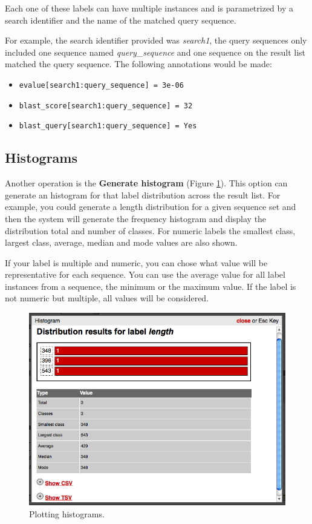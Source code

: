Each one of these labels can have multiple instances and is parametrized by a search identifier
and the name of the matched query sequence.

For example, the search identifier provided was \textit{search1}, the
query sequences only included one sequence named \textit{query\_sequence} and
one sequence on the result list matched the query sequence.
The following annotations would be made:

\begin{itemize}
  \item \texttt{evalue[search1:query\_sequence] = 3e-06}
  \item \texttt{blast\_score[search1:query\_sequence] = 32}
  \item \texttt{blast\_query[search1:query\_sequence] = Yes}
\end{itemize}

\subsection{Histograms}

Another operation is the \textbf{Generate histogram} (Figure \ref{fig:histogram_man}).
This option can generate an histogram
for that label distribution across the result list. For example, you could generate a length
distribution for a given sequence set and then the system will generate the frequency histogram
and display the distribution total and number of classes.
For numeric labels the smallest class, largest class, average, median and mode values are also shown.

If your label is multiple and numeric, you can chose what value will be representative for each sequence.
You can use the average value for all label instances from a sequence, the minimum or the maximum value.
If the label is not numeric but multiple, all values will be considered.

\begin{figure}[ht]
  \centering
    \includegraphics[scale=0.4]{histogram.png}
  \caption{Plotting histograms.}
  \label{fig:histogram_man}
\end{figure}

